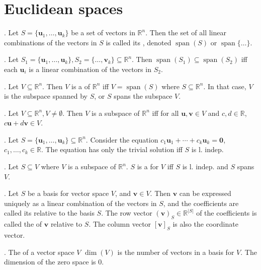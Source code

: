 \documentclass{slnotes}
\DeclareMathOperator*{\laspan}{span}
\begin{document}
\chapter{Euclidean spaces}
. Let \(S = \{\mathbf{u}_1, \hdots, \mathbf{u}_k\}\) be a set of vectors in \(\mathbb{R}^n\). Then the set of all linear combinations of the vectors in \(S\) is called its , denoted \(\laspan(S)\) or \(\laspan\{\hdots\}\).

. Let \(S_1 = \{\mathbf{u}_1, \hdots, \mathbf{u}_k\}, S_2 = \{\hdots, \mathbf{v}_k\} \subseteq \mathbb{R}^n\). Then \(\laspan(S_1) \subseteq \laspan(S_2)\) iff each \(\mathbf{u}_i\) is a linear combination of the vectors in \(S_2\).

. Let \(V \subseteq \mathbb{R}^n\). Then \(V\) is a  of \(\mathbb{R}^n\) iff \(V = \laspan(S)\) where \(S \subseteq \mathbb{R}^n\). In that case, \(V\) is the subspace spanned by \(S\), or \(S\) spans the subspace \(V\).

. Let \(V \subseteq \mathbb{R}^n, V \neq \emptyset\). Then \(V\) is a subspace of \(\mathbb{R}^n\) iff for all \(\mathbf{u}, \mathbf{v} \in V\) and \(c, d \in \mathbb{R}\), \(c\mathbf{u} + d\mathbf{v} \in V\).

. Let \(S = \{\mathbf{u}_1, \hdots, \mathbf{u}_k\} \subseteq \mathbb{R}^n\). Consider the equation \(c_1\mathbf{u}_1 + \cdots + c_k\mathbf{u}_k = \mathbf{0}\), \(c_1, \hdots, c_k \in \mathbb{R}\). The equation has only the trivial solution iff \(S\) is l. indep.

. Let \(S \subseteq V\) where \(V\) is a subspace of \(\mathbb{R}^n\). \(S\) is a  for \(V\) iff \(S\) is l. indep. and \(S\) spans \(V\).

. Let \(S\) be a basis for vector space \(V\), and \(\mathbf{v} \in V\). Then \(\mathbf{v}\) can be expressed uniquely as a linear combination of the vectors in \(S\), and the coefficients are called its  relative to the basis \(S\). The row vector \((\mathbf{v})_S \in \mathbb{R}^{\lvert S \rvert}\) of the coefficients is called the  of \(\mathbf{v}\) relative to \(S\). The column vector \([\mathbf{v}]_S\) is also the coordinate vector.

. The  of a vector space \(V\) \(\dim(V)\) is the number of vectors in a basis for \(V\). The dimension of the zero space is 0.
\end{document}
